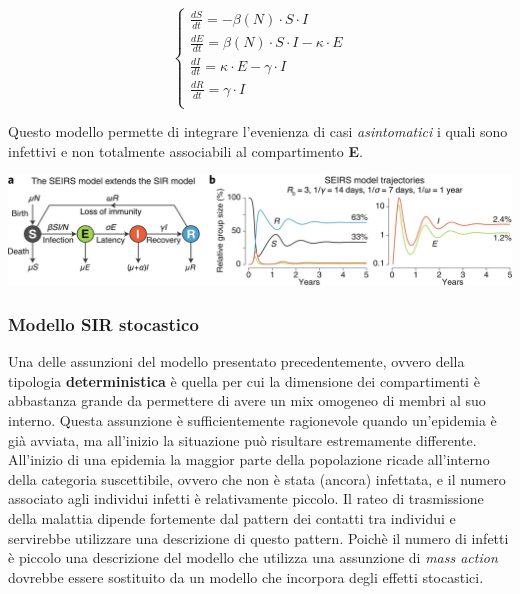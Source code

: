 \[
    \left\{
    \begin{array}{ll}
        \frac{dS}{dt} = - \beta(N) \cdot S \cdot I\\
        \frac{dE}{dt} = \beta(N) \cdot S \cdot I - \kappa \cdot E\\
        \frac{dI}{dt} = \kappa \cdot E - \gamma \cdot I\\
        \frac{dR}{dt} = \gamma \cdot I\\
    \end{array}
    \right.
\]

Questo modello permette di integrare l'evenienza di casi \emph{asintomatici} i quali sono infettivi e non totalmente 
associabili al compartimento \textbf{E}.

\begin{minipage}{\linewidth}
    \centering
    \includegraphics[width=\textwidth]{img/41592_2020_856_Fig1_HTML.png}
    \label{fig:SEIRS_model}
\end{minipage}

\subsubsection{Modello SIR stocastico}
Una delle assunzioni del modello presentato precedentemente, ovvero della tipologia \textbf{deterministica} è quella per cui la dimensione 
dei compartimenti è abbastanza grande da permettere di avere un mix omogeneo di membri al suo interno. Questa assunzione è sufficientemente
ragionevole quando un'epidemia è già avviata, ma all'inizio la situazione può risultare estremamente differente. All'inizio di una 
epidemia la maggior parte della popolazione ricade all'interno della categoria suscettibile, ovvero che non è stata (ancora) infettata, e il numero associato 
agli individui infetti è relativamente piccolo. Il rateo di trasmissione della malattia dipende fortemente dal pattern dei contatti tra individui e servirebbe utilizzare 
una descrizione di questo pattern. Poichè il numero di infetti è piccolo una descrizione del modello che utilizza una assunzione di \emph{mass action} dovrebbe essere 
sostituito da un modello che incorpora degli effetti stocastici.

